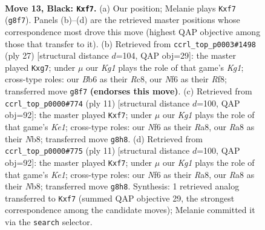 \documentclass[11pt]{article}
\begin{document}
\clearpage

\begin{figure}[p]\centering
\begin{subfigure}{0.46\textwidth}\centering
\resizebox{\linewidth}{!}{%
\newchessgame
\chessboard[
  setfen={r2q2k1/1bp2Bpp/pb1p1n2/1p2n3/4P3/2P5/PP3PPP/RNBQR1K1 b - - 0 13},
  showmover=false,
  pgfstyle=straightmove, color=movearrow, markmove={g8-f7}
]}
\caption{}
\end{subfigure}\hfill
\begin{subfigure}{0.46\textwidth}\centering
\resizebox{\linewidth}{!}{%
\newchessgame
\chessboard[
  setfen={2rq1rk1/pp2ppBp/1n1pb1p1/8/4P3/5P2/PPPQN1PP/1K1R1B1R b - - 0 14},
  showmover=false,
  pgfstyle=straightmove, color=movearrow, markmove={g8-g7}
]}
\caption{}
\end{subfigure}
\\[4pt]
\begin{subfigure}{0.46\textwidth}\centering
\resizebox{\linewidth}{!}{%
\newchessgame
\chessboard[
  setfen={rnbqk2r/ppp1pBbp/3p2p1/6B1/3Pn3/2N5/PPP2PPP/R2QK1NR b KQkq - 0 6},
  showmover=false,
  pgfstyle=straightmove, color=movearrow, markmove={e8-f7}
]}
\caption{}
\end{subfigure}\hfill
\begin{subfigure}{0.46\textwidth}\centering
\resizebox{\linewidth}{!}{%
\newchessgame
\chessboard[
  setfen={rnbqk2r/ppp1pBbp/3p2p1/6B1/3Pn3/2N5/PPP2PPP/R2QK1NR b KQkq - 0 6},
  showmover=false,
  pgfstyle=straightmove, color=movearrow, markmove={e8-f7}
]}
\caption{}
\end{subfigure}
\caption{\textbf{Move 13, Black: \texttt{Kxf7}.} (a) Our position; Melanie plays \texttt{Kxf7} (\texttt{g8f7}). Panels (b)--(d) are the retrieved master positions whose correspondence most drove this move (highest QAP objective among those that transfer to it). (b) Retrieved from \texttt{ccrl\_top\_p0003\#1498} (ply 27) [structural distance $d$=104, QAP obj=29]: the master played \texttt{Kxg7}; under $\mu$ our \emph{Kg1} plays the role of that game's \emph{Kg1}; cross-type roles: our \emph{B}b6 as their \emph{R}c8, our \emph{N}f6 as their \emph{R}f8; transferred move \texttt{g8f7} \textbf{(endorses this move)}. (c) Retrieved from \texttt{ccrl\_top\_p0000\#774} (ply 11) [structural distance $d$=100, QAP obj=92]: the master played \texttt{Kxf7}; under $\mu$ our \emph{Kg1} plays the role of that game's \emph{Ke1}; cross-type roles: our \emph{N}f6 as their \emph{R}a8, our \emph{R}a8 as their \emph{N}b8; transferred move \texttt{g8h8}. (d) Retrieved from \texttt{ccrl\_top\_p0000\#775} (ply 11) [structural distance $d$=100, QAP obj=92]: the master played \texttt{Kxf7}; under $\mu$ our \emph{Kg1} plays the role of that game's \emph{Ke1}; cross-type roles: our \emph{N}f6 as their \emph{R}a8, our \emph{R}a8 as their \emph{N}b8; transferred move \texttt{g8h8}. Synthesis: 1 retrieved analog transferred to \texttt{Kxf7} (summed QAP objective 29, the strongest correspondence among the candidate moves); Melanie committed it via the \texttt{search} selector.}
\label{fig:thought-m25}
\end{figure}
\end{document}
